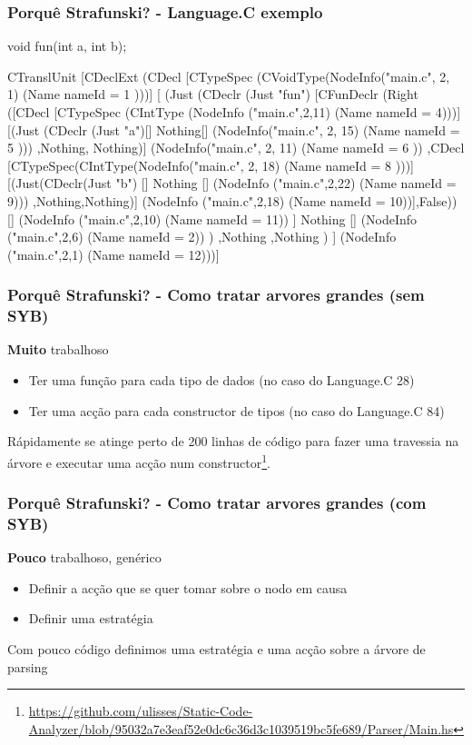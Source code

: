 \documentclass{beamer}
\begin{document}
\begin{frame}[fragile] \frametitle{Porquê Strafunski? - Language.C exemplo}
\begin{block}{void fun(int a, int b);}
\begin{haskell}
CTranslUnit 
[CDeclExt
(CDecl
[CTypeSpec (CVoidType(NodeInfo("main.c", 2, 1) (Name { nameId = 1 })))]
[ (Just
(CDeclr (Just "fun")
[CFunDeclr (Right
([CDecl [CTypeSpec (CIntType (NodeInfo ("main.c",2,11) (Name {nameId = 4})))]
[(Just (CDeclr (Just "a")[] Nothing[] (NodeInfo("main.c", 2, 15)
(Name { nameId = 5 })))
,Nothing, Nothing)] (NodeInfo("main.c", 2, 11) (Name { nameId = 6 }))
,CDecl [CTypeSpec(CIntType(NodeInfo("main.c", 2, 18) (Name { nameId = 8 })))]
[(Just(CDeclr(Just "b") [] Nothing [] (NodeInfo ("main.c",2,22)
(Name {nameId = 9})))
,Nothing,Nothing)]
(NodeInfo ("main.c",2,18) (Name {nameId = 10}))],False))
[] (NodeInfo ("main.c",2,10) (Name {nameId = 11}))
]
Nothing [] (NodeInfo ("main.c",2,6) (Name {nameId = 2}))
)
,Nothing
,Nothing
)
] (NodeInfo ("main.c",2,1) (Name {nameId = 12})))]
\end{haskell}
\end{block}
\end{frame}

\begin{frame} \frametitle{Porquê Strafunski? - Como tratar arvores grandes (sem SYB)}
\begin{alertblock}{\textbf{Muito} trabalhoso}
\begin{itemize}
\item Ter uma função para cada tipo de dados (no caso do Language.C 28)
\item Ter uma acção para cada constructor de tipos (no caso do Language.C 84)
\end{itemize}
\end{alertblock}
Rápidamente se atinge perto de 200 linhas de código para fazer uma travessia na árvore e executar uma acção num constructor\footnote{\url{https://github.com/ulisses/Static-Code-Analyzer/blob/95032a7e3eaf52e0dc6c36d3c1039519bc5fe689/Parser/Main.hs}}.
\end{frame}

\begin{frame} \frametitle{Porquê Strafunski? - Como tratar arvores grandes (com SYB)}
\begin{exampleblock}{\textbf{Pouco} trabalhoso, genérico}
\begin{itemize}
\item Definir a acção que se quer tomar sobre o nodo em causa
\item Definir uma estratégia
\end{itemize}
\end{exampleblock}
Com pouco código definimos uma estratégia e uma acção sobre a árvore de parsing
\end{frame}
\end{document}
